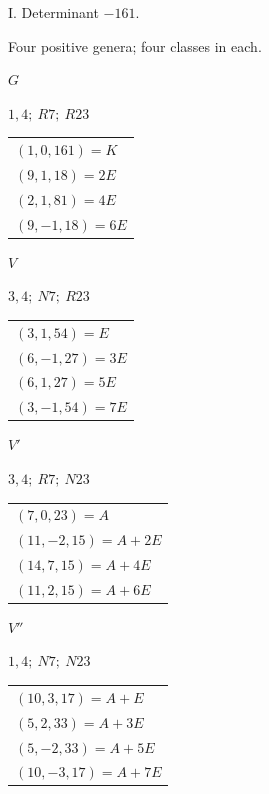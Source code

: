 \begin{center}I. Determinant \(-161\).\par\smallskip Four positive genera; four classes in each.\end{center}
\begin{center}
\begin{minipage}[t]{0.47\linewidth}\centering
\(G\)\par\smallskip
{\small \(1,4;\ R7;\ R23\)}\par\smallskip
\begin{tabular}{@{}l@{}}
\((1,0,161)=K\)\\\((9,1,18)=2E\)\\\((2,1,81)=4E\)\\\((9,-1,18)=6E\)
\end{tabular}
\end{minipage}\hfill\begin{minipage}[t]{0.47\linewidth}\centering
\(V\)\par\smallskip
{\small \(3,4;\ N7;\ R23\)}\par\smallskip
\begin{tabular}{@{}l@{}}
\((3,1,54)=E\)\\\((6,-1,27)=3E\)\\\((6,1,27)=5E\)\\\((3,-1,54)=7E\)
\end{tabular}
\end{minipage}
\end{center}
\begin{center}
\begin{minipage}[t]{0.47\linewidth}\centering
\(V'\)\par\smallskip
{\small \(3,4;\ R7;\ N23\)}\par\smallskip
\begin{tabular}{@{}l@{}}
\((7,0,23)=A\)\\\((11,-2,15)=A+2E\)\\\((14,7,15)=A+4E\)\\\((11,2,15)=A+6E\)
\end{tabular}
\end{minipage}\hfill\begin{minipage}[t]{0.47\linewidth}\centering
\(V''\)\par\smallskip
{\small \(1,4;\ N7;\ N23\)}\par\smallskip
\begin{tabular}{@{}l@{}}
\((10,3,17)=A+E\)\\\((5,2,33)=A+3E\)\\\((5,-2,33)=A+5E\)\\\((10,-3,17)=A+7E\)
\end{tabular}
\end{minipage}
\end{center}
